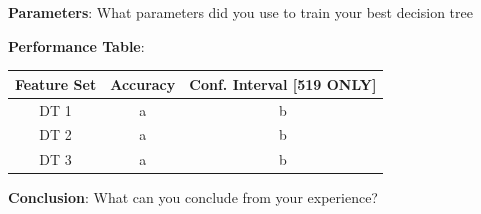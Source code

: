 \documentclass{article}
\begin{document}
        \noindent\textbf{Parameters}: What parameters did you use to train your best decision tree
        
        \noindent\textbf{Performance Table}: 
        \begin{center}
            \begin{tabular}{|c|c|c|}
                \hline
                Feature Set & Accuracy & Conf. Interval [519 ONLY]\\
                \hline
                DT 1 & a & b  \\
                DT 2 & a & b  \\
                DT 3 & a & b  \\
                \hline
        \end{tabular}
                \end{center}
        
        
        
        \textbf{Conclusion}: What can you conclude from your experience?
        
\end{document}

